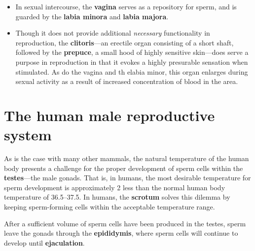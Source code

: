 \documentclass{article}
\begin{document}
\begin{itemize}
	\item In sexual intercourse, the \textbf{vagina} serves as a repository for sperm, and
		is guarded by the \textbf{labia minora} and \textbf{labia majora}.
	\item Though it does not provide additional \emph{necessary} functionality in
		reproduction, the \textbf{clitoris}---an erectile organ consisting of a short shaft,
		followed by the \textbf{prepuce}, a small hood of highly sensitive skin---does serve
		a purpose in reproduction in that it evokes a highly presurable sensation when
		stimulated. As do the vagina and th elabia minor, this organ enlarges during sexual
		activity as a result of increased concentration of blood in the area.
\end{itemize}

\section{The human male reproductive system}

As is the case with many other mammals, the natural temperature of the human body presents a
challenge for the proper development of sperm cells within the \textbf{testes}---the male
gonads. That is, in humans, the most desirable temperature for sperm development is
approximately 2 less than the normal human body temperature of
36.5--37.5. In humans, the \textbf{scrotum} solves this dilemma by keeping
sperm-forming cells within the acceptable temperature range.

After a sufficient volume of sperm cells have been produced in the testes, sperm leave
the gonads through the \textbf{epididymis}, where sperm cells will continue to develop
until \textbf{ejaculation}.
\end{document}
